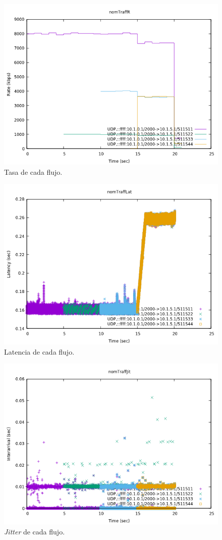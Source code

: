 \documentclass[11pt]{article}
\begin{document}
        \begin{figure}
            \centering
            \includegraphics[width=0.6\linewidth]{nomTraffR.png}
            \caption{Tasa de cada flujo.}
            \label{fig:nomR}
        \end{figure}

        \begin{figure}
            \centering
            \includegraphics[width=0.6\linewidth]{nomTraffLat.png}
            \caption{Latencia de cada flujo.}
            \label{fig:nomLat}
        \end{figure}

        \begin{figure}
            \centering
            \includegraphics[width=0.6\linewidth]{nomTraffJit.png}
            \caption{\textit{Jitter} de cada flujo.}
            \label{fig:nomJit}
        \end{figure}
\end{document}

